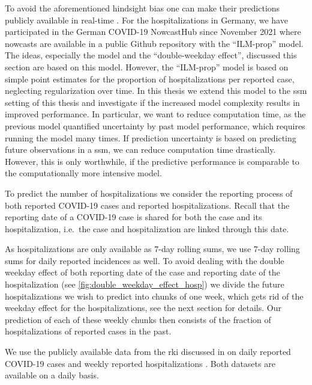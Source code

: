 To avoid the aforementioned hindsight bias one can make their predictions publicly available in real-time \citep{Ray2020Ensemble,Bracher2021Preregistered}. For the hospitalizations in Germany, we have participated in the German COVID-19 NowcastHub \citep{2022Nowcasts} since November 2021 where nowcasts are available in a public Github repository \citep{2022Hospitalization} with the ``ILM-prop'' model. The ideas, especially the model and the ``double-weekday effect'', discussed this section are based on this model. However, the ``ILM-prop'' model is based on simple point estimates for the proportion of hospitalizations per reported case, neglecting regularization over time. In this thesis we extend this model to the \gls{ssm} setting of this thesis and investigate if the increased model complexity results in improved performance. In particular, we want to reduce computation time, as the previous model quantified uncertainty by past model performance, which requires running the model many times. If prediction uncertainty is based on predicting future observations in a \acrshort{ssm}, we can reduce computation time drastically. However, this is only worthwhile, if the predictive performance is comparable to the computationally more intensive model. 

To predict the number of hospitalizations we consider the reporting process of both reported COVID-19 cases and reported hospitalizations. Recall that the reporting date of a COVID-19 case is shared for both the case and its hospitalization, i.e.~the case and hospitalization are linked through this date.

As hospitalizations are only available as \(7\)-day rolling sums, we use \(7\)-day rolling sums for daily reported incidences as well. To avoid dealing with the double weekday effect of both reporting date of the case and reporting date of the hospitalization (see \cref{fig:double_weekday_effect_hosp}) we divide the future hospitalizations we wish to predict into chunks of one week, which gets rid of the weekday effect for the hospitalizations, see the next section for details. Our prediction of each of these weekly chunks then consists of the fraction of hospitalizations of reported cases in the past.

We use the publicly available data from the \acrshort{rki} discussed in  on daily reported COVID-19 cases \citep{RobertKoch-Institut2024SARSCoV2} and weekly reported hospitalizations \citep{RobertKoch-Institut2024COVID19Hospitalisierungen}. Both datasets are available on a daily basis.

